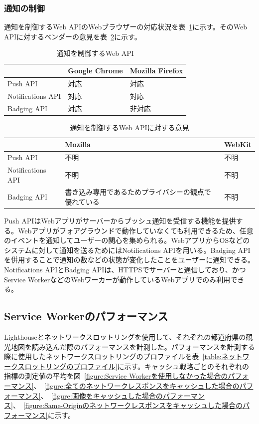 \subsubsection{通知の制御}\label{subsubsection:通知の制御}
通知を制御するWeb APIのWebブラウザーの対応状況を表~\ref{table:通知を制御するWeb API}に示す。そのWeb APIに対するベンダーの意見を表~\ref{table:通知を制御するWeb APIに対する意見}に示す。
\begin{table}
  \caption{通知を制御するWeb API}\label{table:通知を制御するWeb API}
  \centering
  \begin{tabular}{|p{13em}|p{8em}|p{8em}|}
    \hline
    & Google Chrome & Mozilla Firefox \\ \hline
    Push API & \cellcolor{green!25}対応 & \cellcolor{green!25}対応 \\ \hline
    Notifications API & \cellcolor{green!25}対応 & \cellcolor{green!25}対応 \\ \hline
    Badging API & \cellcolor{green!25}対応 & \cellcolor{red!25}非対応 \\ \hline
  \end{tabular}
\end{table}
\begin{table}
  \caption{通知を制御するWeb APIに対する意見}
  \label{table:通知を制御するWeb APIに対する意見}
    \centering
    \begin{tabular}{|p{13em}|p{13em}|p{13em}|}
        \hline
        & Mozilla & WebKit \\ \hline
        Push API & 不明 & 不明 \\ \hline
        Notifications API & 不明 & 不明 \\ \hline
        Badging API & \cellcolor{green!25}書き込み専用であるためプライバシーの観点で優れている~\cite{MozillaBadgingAPI} & 不明 \\ \hline
    \end{tabular}
\end{table}
Push APIはWebアプリがサーバーからプッシュ通知を受信する機能を提供する。Webアプリがフォアグラウンドで動作していなくても利用できるため、任意のイベントを通知してユーザーの関心を集められる。WebアプリからOSなどのシステムに対して通知を送るためにはNotifications APIを用いる。Badging APIを併用することで通知の数などの状態が変化したことをユーザーに通知できる。Notifications APIとBadging APIは、HTTPSでサーバーと通信しており、かつService WorkerなどのWebワーカーが動作しているWebアプリでのみ利用できる。
\subsection{Service Workerのパフォーマンス}\label{subsubsection:Service Workerのパフォーマンス}
Lighthouseとネットワークスロットリングを使用して、それぞれの都道府県の観光地図を読み込んだ際のパフォーマンスを計測した。パフォーマンスを計測する際に使用したネットワークスロットリングのプロファイルを表~\ref{table:ネットワークスロットリングのプロファイル}に示す。キャッシュ戦略ごとのそれぞれの指標の測定値の平均を図~\ref{figure:Service Workerを使用しなかった場合のパフォーマンス}、~\ref{figure:全てのネットワークレスポンスをキャッシュした場合のパフォーマンス}、~\ref{figure:画像をキャッシュした場合のパフォーマンス}、~\ref{figure:Same-Originのネットワークレスポンスをキャッシュした場合のパフォーマンス}に示す。

